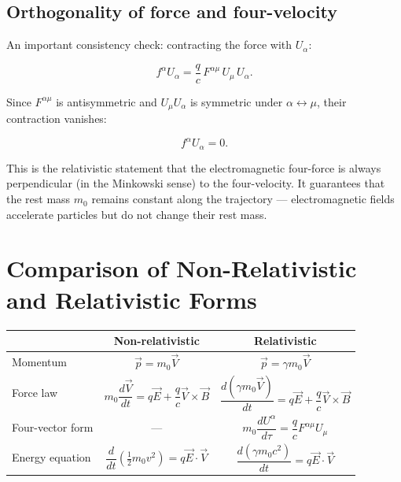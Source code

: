\subsection*{Orthogonality of force and four-velocity}

An important consistency check: contracting the force with $U_\alpha$:

\begin{equation}
f^\alpha U_\alpha = \frac{q}{c}\,F^{\alpha\mu}\,U_\mu\,U_\alpha.
\end{equation}

Since $F^{\alpha\mu}$ is antisymmetric and $U_\mu U_\alpha$ is symmetric under $\alpha \leftrightarrow \mu$, their contraction vanishes:

\begin{equation}
f^\alpha U_\alpha = 0.
\end{equation}

This is the relativistic statement that the electromagnetic four-force is always perpendicular (in the Minkowski sense) to the four-velocity. It guarantees that the rest mass $m_0$ remains constant along the trajectory --- electromagnetic fields accelerate particles but do not change their rest mass.

\section{Comparison of Non-Relativistic and Relativistic Forms}

\begin{table}[h]
\centering
\begin{tabular}{lcc}
\toprule
& \textbf{Non-relativistic} & \textbf{Relativistic} \\
\midrule
Momentum & $\vec{p} = m_0\vec{V}$ & $\vec{p} = \gamma m_0\vec{V}$ \\[6pt]
Force law & $m_0\dfrac{d\vec{V}}{dt} = q\vec{E} + \dfrac{q}{c}\vec{V}\times\vec{B}$ & $\dfrac{d(\gamma m_0\vec{V})}{dt} = q\vec{E} + \dfrac{q}{c}\vec{V}\times\vec{B}$ \\[12pt]
Four-vector form & --- & $m_0\dfrac{dU^\alpha}{d\tau} = \dfrac{q}{c}F^{\alpha\mu}U_\mu$ \\[8pt]
Energy equation & $\dfrac{d}{dt}\!\left(\tfrac{1}{2}m_0 v^2\right) = q\vec{E}\cdot\vec{V}$ & $\dfrac{d(\gamma m_0 c^2)}{dt} = q\vec{E}\cdot\vec{V}$ \\
\bottomrule
\end{tabular}
\end{table}

